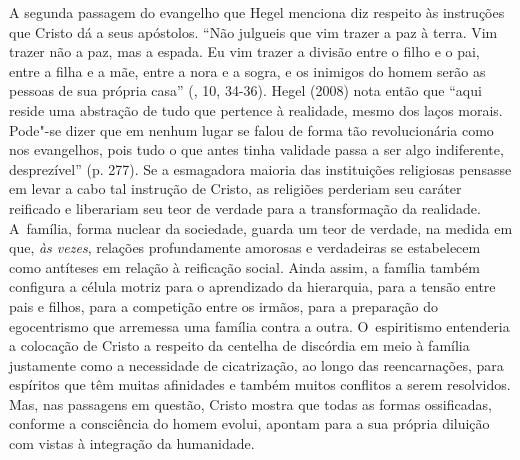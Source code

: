 A segunda passagem do evangelho que Hegel menciona diz respeito às
instruções que Cristo dá a seus apóstolos. ``Não julgueis que vim trazer
a paz à terra. Vim trazer não a paz, mas a espada. Eu vim trazer a
divisão entre o filho e o pai, entre a filha e a mãe, entre a nora e a
sogra, e os inimigos do homem serão as pessoas de sua própria casa''
(, 10, 34-36). Hegel (2008) nota então que ``aqui reside uma
abstração de tudo que pertence à realidade, mesmo dos laços morais.
Pode"-se dizer que em nenhum lugar se falou de forma tão revolucionária
como nos evangelhos, pois tudo o que antes tinha validade passa a ser
algo indiferente, desprezível'' (p. 277). Se a esmagadora maioria das
instituições religiosas pensasse em levar a cabo tal instrução de
Cristo, as religiões perderiam seu caráter reificado e liberariam seu
teor de verdade para a transformação da realidade. A~família, forma
nuclear da sociedade, guarda um teor de verdade, na medida em que,
\emph{às vezes}, relações profundamente amorosas e verdadeiras se
estabelecem como antíteses em relação à reificação social. Ainda assim,
a família também configura a célula motriz para o aprendizado da
hierarquia, para a tensão entre pais e filhos, para a competição entre
os irmãos, para a preparação do egocentrismo que arremessa uma família
contra a outra. O~espiritismo entenderia a colocação de Cristo a
respeito da centelha de discórdia em meio à família justamente como a
necessidade de cicatrização, ao longo das reencarnações, para espíritos
que têm muitas afinidades e também muitos conflitos a serem resolvidos.
Mas, nas passagens em questão, Cristo mostra que todas as formas
ossificadas, conforme a consciência do homem evolui, apontam para a sua
própria diluição com vistas à integração da humanidade.

